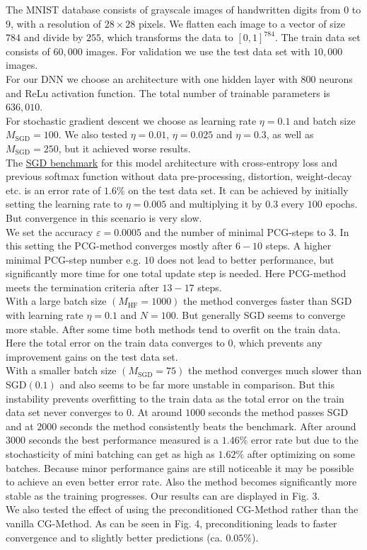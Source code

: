 \documentclass[conference]{IEEEtran}
\begin{document}
	\noindent
	The MNIST database consists of grayscale images of handwritten digits from $0$ to $9$, with a resolution of $28\times28$ pixels. We flatten each image to a vector of size $784$ and divide by $255$, which transforms the data to $[0,1]^{784}$. The train data set consists of $60,000$ images. For validation we use the test data set with $10,000$ images.\\
	For our DNN we choose an architecture with one hidden layer with $800$ neurons and ReLu activation function. The total number of trainable parameters is $636,010$.\\
	For stochastic gradient descent we choose as learning rate $\eta=0.1$ and batch size $M_{\mathrm{SGD}}=100$. We also tested $\eta=0.01$, $\eta=0.025$ and $\eta=0.3$, as well as $M_{\mathrm{SGD}}=250$, but it achieved worse results. \\
	The \href{https://en.wikipedia.org/wiki/MNIST_database}{SGD benchmark} for this model architecture with cross-entropy loss and previous softmax function without data pre-processing, distortion, weight-decay etc. is an error rate of $1.6\%$ on the test data set.
	It can be achieved by initially setting the learning rate to $\eta=0.005$ and multiplying it by $0.3$ every $100$ epochs. But convergence in this scenario is very slow.\\
	\noindent
	We set the accuracy $\varepsilon=0.0005$ and the number of minimal PCG-steps to $3$. In this setting the PCG-method converges mostly after $6-10$ steps. A higher minimal PCG-step number e.g. $10$ does not lead to better performance, but significantly more time for one total update step is needed. Here PCG-method meets the termination criteria after $13-17$ steps.\\
	With a large batch size $(M_{\mathrm{HF}}=1000)$ the method converges faster than SGD with learning rate $\eta=0.1$ and $N=100.$ But generally SGD seems to converge more stable. After some time both methods tend to overfit on the train data. Here the total error on the train data converges to $0$, which prevents any improvement gains on the test data set.\\
	With a smaller batch size $(M_{\mathrm{SGD}}=75)$ the method converges much slower than SGD$(0.1)$ and also seems to be far more unstable in comparison. But this instability prevents overfitting to the train data as the total error on the train data set never converges to $0$. At around $1000$ seconds the method passes SGD and at $2000$ seconds the method consistently beats the benchmark. After around $3000$ seconds the best performance measured is a $1.46\%$ error rate but due to the stochasticity of mini batching can get as high as $1.62\%$ after optimizing on some batches. Because minor performance gains are still noticeable it may be possible to achieve an even better error rate.
	Also the method becomes significantly more stable as the training progresses. Our results can are displayed in Fig. 3.\\
	We also tested the effect of using the preconditioned CG-Method rather than the vanilla CG-Method. 
	As can be seen in Fig. 4, preconditioning leads to faster convergence and to slightly better predictions (ca. $0.05\%$).
	
\end{document}

